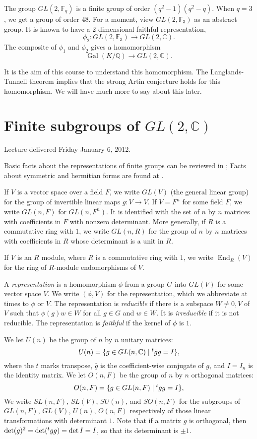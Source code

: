 \documentclass{amsart}
\def\op#1{{\operatorname{#1}}}
\newcommand{\ring}[1]{\mathbb{#1}}
\def\newterm#1{{\it #1}}
\def\t#1{\hbox{}^t#1}
\begin{document}
The group $GL(2,\ring{F}_q)$ is a finite group of order
$(q^2-1)(q^2-q)$.  When $q=3$, we get a group of order $48$.  For a
moment, view $GL(2,\ring{F}_3)$ as an abstract group.  It is known
to have a $2$-dimensional faithful representation,
\[
\phi_2 : GL(2,\ring{F}_3) \to GL(2,\ring{C}).
\]
The composite of $\phi_1$ and $\phi_2$ gives a homomorphism
\[
\op{Gal}(K/\ring{Q}) \to GL(2,\ring{C}).
\]

It is the aim of this course to understand this homomorphism.  The
Langlands-Tunnell theorem implies that the strong Artin conjecture
holds for this homomorphism.  We will have much more to say about this
later.


\newpage
\section{Finite subgroups of $GL(2,\ring{C})$}

Lecture delivered Friday January 6, 2012.


Basic facts about the representations of finite groups can be reviewed
in \cite[p.~326, Sec. VII.4]{knapp-basic}; Facts about symmetric and
hermitian 
forms are found at \cite[p.~250,~Sec.~VI.2,~VI.4]{knapp-basic}.

If $V$ is a vector space over a field $F$, we write $GL(V)$ (the
general linear group) for the group of invertible linear maps $g:V\to
V$.  If $V=F^n$ for some field $F$, we write $GL(n,F)$ for
$GL(n,F^n)$.  It is identified with the set of $n$ by $n$ matrices
with coefficients in $F$ with nonzero determinant.  More generally, if
$R$ is a commutative ring with $1$, we write $GL(n,R)$ for the group
of $n$ by $n$ matrices with coefficients in $R$ whose determinant is a
unit in $R$.

If $V$ is an $R$ module, where $R$ is a commutative ring with $1$, 
we write $\op{End}_R(V)$ for the ring of $R$-module endomorphisms of $V$.

A \newterm{representation} is a homomorphism $\phi$ from a group $G$
into $GL(V)$ for some vector space $V$.  We write $(\phi,V)$ for the
representation, which we abbreviate at times to $\phi$ or $V$.  
The representation is \newterm{reducible} if there is
a subspace $W\ne 0,V$ of $V$ such that $\phi(g)w\in W$ for all $g\in
G$ and $w\in W$.  It is \newterm{irreducible} if it is not reducible.
The representation is \newterm{faithful} if the kernel of $\phi$ is
$1$.

We let $U(n)$ be the group of $n$ by $n$ unitary matrices:
\[
U(n) = \{ g \in GL(n,\ring{C})  \mid \t{\bar g} g = I\},
\]
where the $t$ marks transpose, $\bar g$ is the coefficient-wise
conjugate of $g$, and $I=I_n$ is the identity matrix.  We let $O(n,F)$
be the group of $n$ by $n$ orthogonal matrices:
\[
O(n,F) = \{ g \in GL(n,F) \mid \t{g} g = I\},
\]
We write $SL(n,F)$, $SL(V)$, $SU(n)$, and $SO(n,F)$ for the subgroups
of $GL(n,F)$, $GL(V)$, $U(n)$, $O(n,F)$ respectively of those linear
transformations with determinant $1$.  Note that if a matrix $g$ is orthogonal,
then $\det(g)^2 = \det(\t{g}g) = \det{I} = I$, so that its determinant is $\pm 1$.
\end{document}
